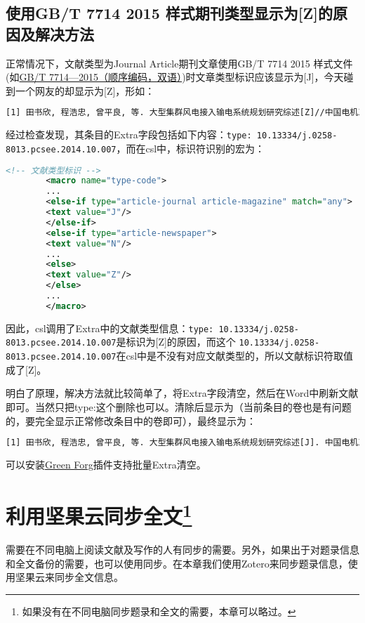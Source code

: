 \documentclass[theorem=false,mathfont=none,openany,sub3section]{easybook}
\begin{document}
\section{使用GB/T 7714 2015 样式期刊类型显示为[Z]的原因及解决方法}\label{sec:GBShowZ}
正常情况下，文献类型为Journal Article期刊文章使用GB/T 7714 2015 样式文件(如\href{https://zotero-chinese.com/styles/gb-t-7714-2015-numeric-bilingual/}{GB/T 7714—2015（顺序编码，双语）})时文章类型标识应该显示为[J]，今天碰到一个网友的却显示为[Z]，形如：
	\begin{lstlisting}[language=HTML]
	[1] 田书欣, 程浩忠, 曾平良, 等. 大型集群风电接入输电系统规划研究综述[Z]//中国电机工程学报: v.34;No.489. 2014: 1566-1574.
	\end{lstlisting}
经过检查发现，其条目的Extra字段包括如下内容：\verb|type: 10.13334/j.0258-8013.pcsee.2014.10.007|，而在csl中，标识符识别的宏为：
	\begin{lstlisting}[language=XML]	
		<!-- 文献类型标识 -->
		<macro name="type-code">
		...
		<else-if type="article-journal article-magazine" match="any">
		<text value="J"/>
		</else-if>
		<else-if type="article-newspaper">
		<text value="N"/>
		...
		<else>
		<text value="Z"/>
		</else>
		...
		</macro>
	\end{lstlisting}
因此，csl调用了Extra中的文献类型信息：\verb|type: 10.13334/j.0258-8013.pcsee.2014.10.007|是标识为[Z]的原因，而这个 \verb|10.13334/j.0258-8013.pcsee.2014.10.007|在csl中是不没有对应文献类型的，所以文献标识符取值成了[Z]。

明白了原理，解决方法就比较简单了，将Extra字段清空，然后在Word中刷新文献即可。当然只把type:这个删除也可以。清除后显示为（当前条目的卷也是有问题的，要完全显示正常修改条目中的卷即可），最终显示为：
	\begin{lstlisting}[language=HTML]
		[1] 田书欣, 程浩忠, 曾平良, 等. 大型集群风电接入输电系统规划研究综述[J]. 中国电机工程学报, 2014, v.34;No.489(10): 1566-1574.
	\end{lstlisting}
	
	可以安装\href{https://github.com/redleafnew/zotero-updateifs}{Green Forg}插件支持批量Extra清空。
	
\chapter[利用坚果云同步全文]{利用坚果云同步全文\footnote{如果没有在不同电脑同步题录和全文的需要，本章可以略过。}}\label{ch:syn}		
需要在不同电脑上阅读文献及写作的人有同步的需要。另外，如果出于对题录信息和全文备份的需要，也可以使用同步。在本章我们使用Zotero来同步题录信息，使用坚果云来同步全文信息。
\end{document}
